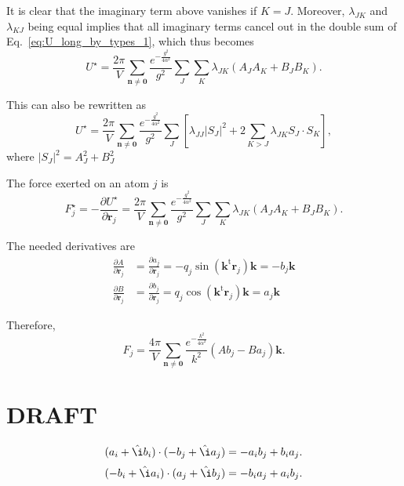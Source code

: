 \documentclass[11pt]{article}
\newcommand{\vt}[1]{\boldsymbol{\mathbf{#1}}}           %
\newcommand{\tr}[1]{#1^\text{t}}                        %
\newcommand{\im}{\hat{\i}}                              %
\begin{document}
It is clear that the imaginary term above vanishes if $K = J$. Moreover, $\lambda_{JK}$ and $\lambda_{KJ}$ being equal implies that all imaginary terms cancel out in the double sum of Eq.~\ref{eq:U_long_by_types_1}, which thus becomes
\begin{equation*}
U^\star = \frac{2\pi}{V}\sum_{\vt n \neq \vt 0} \frac{e^{-\frac{g^2}{4\alpha^2}}}{g^2} \sum_J \sum_K \lambda_{JK} (A_J A_K + B_J B_K).
\end{equation*}

This can also be rewritten as
\begin{equation*}
U^\star = \frac{2\pi}{V}\sum_{\vt n \neq \vt 0} \frac{e^{-\frac{g^2}{4\alpha^2}}}{g^2} \sum_J \left[\lambda_{JJ} |S_J|^2 + 2 \sum_{K>J} \lambda_{JK} S_J \cdot S_K\right],
\end{equation*}
where $|S_J|^2 = A_J^2 + B_J^2$


The force exerted on an atom $j$ is
\begin{equation*}
F_j^\star = -\frac{\partial U^\star}{\partial \vt r_j} = \frac{2\pi}{V}\sum_{\vt n \neq \vt 0} \frac{e^{-\frac{g^2}{4\alpha^2}}}{g^2} \sum_J \sum_K \lambda_{JK} (A_J A_K + B_J B_K).
\end{equation*}

The needed derivatives are
\begin{align*}
\frac{\partial A}{\partial \vt r_j} &= \frac{\partial a_j}{\partial \vt r_j} = -q_j \sin(\tr{\vt k}{\vt r}_j){\vt k} = -b_j{\vt k} \\
\frac{\partial B}{\partial \vt r_j} &= \frac{\partial b_j}{\partial \vt r_j} = q_j \cos(\tr{\vt k}{\vt r}_j){\vt k} = a_j{\vt k}
\end{align*}

Therefore,
\begin{equation*}
F_j = \frac{4\pi}{V}\sum_{\vt n \neq \vt 0} \frac{e^{-\frac{k^2}{4\alpha^2}}}{k^2} \left( A b_j - B a_j \right){\vt k}.
\end{equation*}

\section{DRAFT}
\begin{equation*}
(a_i + \im b_i)\cdot(-b_j + \im a_j) = -a_i b_j + b_i a_j.
\end{equation*}
\begin{equation*}
(-b_i + \im a_i)\cdot(a_j + \im b_j) = -b_i a_j + a_i b_j.
\end{equation*}
\end{document}
